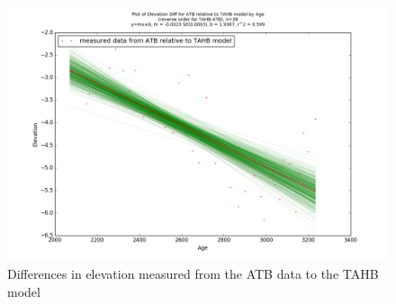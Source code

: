 \begin{figure}[h]
	\includegraphics[width=0.9\linewidth]{data/bothNonZero/withinSeventyFivePercent/gias/theGIA_ATB_relative_to_TAHB.png}
	\caption{Differences in elevation measured from the ATB data to the TAHB model}
	\label{fig:gias_ATBxTAHB}
\end{figure}
\newpage







